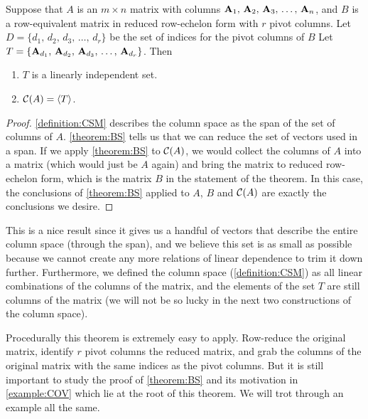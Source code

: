 \documentclass{ximera}
\begin{document}
\begin{theorem}
  \label{theorem:BCS}
  Suppose that $A$ is an $m\times n$ matrix with columns
  $\mathbf{A}_{1},\,\mathbf{A}_{2},\,\mathbf{A}_{3},\,\ldots,\,\mathbf{A}_{n}$, and $B$ is a row-equivalent matrix in reduced
  row-echelon form with $r$ pivot columns.  Let
  $D=\{d_1,\,d_2,\,d_3,\,\ldots,\,d_r\}$ be the set of indices for the
  pivot columns of $B$ Let
  $T=\left\{\mathbf{A}_{d_1},\,\mathbf{A}_{d_2},\,\mathbf{A}_{d_3},\,\ldots,\,\mathbf{A}_{d_r}\right\}$.
  Then
  \begin{enumerate}
  \item $T$ is a linearly independent set.
  \item $\mathcal{C}\!\left(A\right)=\left\langle T\right\rangle$.
  \end{enumerate}


  \begin{proof}
    \ref{definition:CSM} describes the column space as the span of the
    set of columns of $A$.  \ref{theorem:BS} tells us that we can
    reduce the set of vectors used in a span.  If we apply
    \ref{theorem:BS} to $\mathcal{C}\!\left(A\right)$, we would collect the columns of $A$
    into a matrix (which would just be $A$ again) and bring the matrix
    to reduced row-echelon form, which is the matrix $B$ in the
    statement of the theorem.  In this case, the conclusions of
    \ref{theorem:BS} applied to $A$, $B$ and $\mathcal{C}\!\left(A\right)$ are exactly the
    conclusions we desire.
\end{proof}
\end{theorem}

This is a nice result since it gives us a handful of vectors that
describe the entire column space (through the span), and we believe
this set is as small as possible because we cannot create any more
relations of linear dependence to trim it down further.  Furthermore,
we defined the column space (\ref{definition:CSM}) as all linear
combinations of the columns of the matrix, and the elements of the set
$T$ are still columns of the matrix (we will not be so lucky in the
next two constructions of the column space).

Procedurally this theorem is extremely easy to apply.  Row-reduce the
original matrix, identify $r$ pivot columns the reduced matrix, and
grab the columns of the original matrix with the same indices as the
pivot columns.  But it is still important to study the proof of
\ref{theorem:BS} and its motivation in \ref{example:COV} which lie at
the root of this theorem.  We will trot through an example all the
same.
\end{document}
